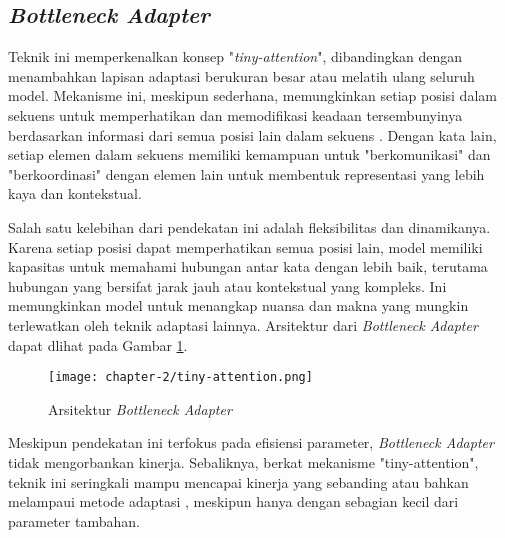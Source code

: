 \subsection{\textit{Bottleneck Adapter}}

Teknik ini memperkenalkan konsep "\textit{tiny-attention}", dibandingkan dengan menambahkan lapisan adaptasi berukuran besar atau melatih ulang seluruh model. Mekanisme ini, meskipun sederhana, memungkinkan setiap posisi dalam sekuens untuk memperhatikan dan memodifikasi keadaan tersembunyinya berdasarkan informasi dari semua posisi lain dalam sekuens \parencite{tinyattention}. Dengan kata lain, setiap elemen dalam sekuens memiliki kemampuan untuk "berkomunikasi" dan "berkoordinasi" dengan elemen lain untuk membentuk representasi yang lebih kaya dan kontekstual.

Salah satu kelebihan dari pendekatan ini adalah fleksibilitas dan dinamikanya. Karena setiap posisi dapat memperhatikan semua posisi lain, model memiliki kapasitas untuk memahami hubungan antar kata dengan lebih baik, terutama hubungan yang bersifat jarak jauh atau kontekstual yang kompleks. Ini memungkinkan model untuk menangkap nuansa dan makna yang mungkin terlewatkan oleh teknik adaptasi lainnya. Arsitektur dari \textit{Bottleneck Adapter} dapat dlihat pada Gambar \ref{fig:tiny-attention}.

\begin{figure}[ht]
    \centering
    \texttt{[image: chapter-2/tiny-attention.png]}
    \caption{Arsitektur \textit{Bottleneck Adapter} \parencite{tinyattention}}
    \label{fig:tiny-attention}
\end{figure}


Meskipun pendekatan ini terfokus pada efisiensi parameter, \textit{Bottleneck Adapter} tidak mengorbankan kinerja. Sebaliknya, berkat mekanisme "tiny-attention", teknik ini seringkali mampu mencapai kinerja yang sebanding atau bahkan melampaui metode adaptasi , meskipun hanya dengan sebagian kecil dari parameter tambahan.

